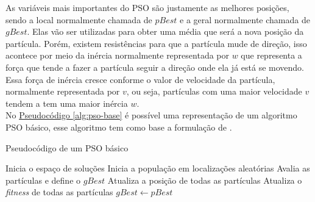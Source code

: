 \indent As variáveis mais importantes do PSO são justamente as melhores posições, sendo a local normalmente chamada de $pBest$ e a geral normalmente chamada de $gBest$. Elas vão ser utilizadas para obter uma média que será a nova posição da partícula. Porém, existem resistências para que a partícula mude de direção, isso acontece por meio da inércia normalmente representada por $w$ que representa a força que tende a fazer a partícula seguir a direção onde ela já está se movendo. Essa força de inércia cresce conforme o valor de velocidade da partícula, normalmente representada por $v$, ou seja, partículas com uma maior velocidade $v$ tendem a tem uma maior inércia $w$.\\
\indent No \hyperref[alg:pso-base]{Pseudocódigo \ref{alg:pso-base}} 
é possível uma representação de um algoritmo PSO básico, esse algoritmo tem como base a formulação de \cite{martinez2009}.
\begin{algorithm}
    \caption{Pseudocódigo de um PSO básico}\label{alg:pso-base}
\begin{algorithmic}
\State Inicia o espaço de soluções
\State Inicia a população em localizações aleatórias
\State Avalia as partículas e define o $gBest$
  \State Atualiza a posição de todas as partículas
  \State Atualiza o \textit{fitness} de todas as partículas
    \State $gBest \gets pBest$
\EndIf
\EndWhile

\end{algorithmic}
\end{algorithm}


